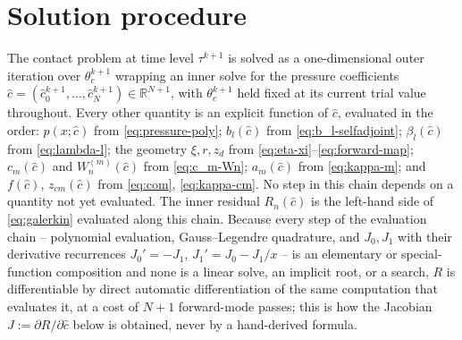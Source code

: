 \section{Solution procedure}
\label{subsec:newton}

The contact problem at time level $\tau^{k+1}$ is solved as a one-dimensional outer iteration over $\theta_c^{k+1}$ wrapping an inner solve for the pressure coefficients $\hat c=(\hat c_0^{k+1},\dots,\hat c_N^{k+1})\in\mathbb R^{N+1}$, with $\theta_c^{k+1}$ held fixed at its current trial value throughout. Every other quantity is an explicit function of $\hat c$, evaluated in the order: $p(x;\hat c)$ from \eqref{eq:pressure-poly}; $b_l(\hat c)$ from \eqref{eq:b_l-selfadjoint}; $\beta_l(\hat c)$ from \eqref{eq:lambda-l}; the geometry $\xi,r,z_d$ from \eqref{eq:eta-xi}--\eqref{eq:forward-map}; $c_m(\hat c)$ and $W_n^{(m)}(\hat c)$ from \eqref{eq:c_m-Wn}; $a_m(\hat c)$ from \eqref{eq:kappa-m}; and $f(\hat c)$, $z_{cm}(\hat c)$ from \eqref{eq:com}, \eqref{eq:kappa-cm}. No step in this chain depends on a quantity not yet evaluated. The inner residual $R_n(\hat c)$ is the left-hand side of \eqref{eq:galerkin} evaluated along this chain. Because every step of the evaluation chain -- polynomial evaluation, Gauss--Legendre quadrature, and $J_0,J_1$ with their derivative recurrences $J_0'=-J_1$, $J_1'=J_0-J_1/x$ -- is an elementary or special-function composition and none is a linear solve, an implicit root, or a search, $R$ is differentiable by direct automatic differentiation of the same computation that evaluates it, at a cost of $N+1$ forward-mode passes; this is how the Jacobian $J:=\partial R/\partial\hat c$ below is obtained, never by a hand-derived formula.

